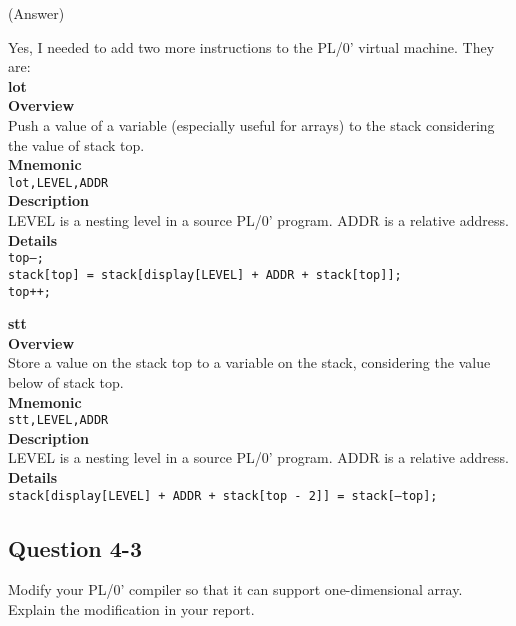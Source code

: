 \documentclass{article}
\begin{document}
\ifreport
(Answer)\\
\fi

Yes, I needed to add two more instructions to the PL/0' virtual machine.
They are:\\

\noindent\textbf{\Large lot}\\

\noindent\textbf{Overview}\\
\indent Push a value of a variable (especially useful for arrays)
 to the stack considering the value of stack top.\\

\noindent\textbf{Mnemonic}\\
\indent \texttt{lot,LEVEL,ADDR}\\

\noindent\textbf{Description}\\
\indent LEVEL is a nesting level in a source PL/0' program.
 ADDR is a relative address.\\

\noindent\textbf{Details}\\
\indent \texttt{top--;\\
\indent stack[top] = stack[display[LEVEL] + ADDR + stack[top]];\\
\indent top++;}\\

\vspace{0.5cm}

\noindent\textbf{\Large stt}\\

\noindent\textbf{Overview}\\
\indent Store a value on the stack top to a variable on the stack,
considering the value below of stack top.\\

\noindent\textbf{Mnemonic}\\
\indent \texttt{stt,LEVEL,ADDR}\\

\noindent\textbf{Description}\\
\indent LEVEL is a nesting level in a source PL/0' program.
 ADDR is a relative address.\\

\noindent\textbf{Details}\\
\indent \texttt{stack[display[LEVEL] + ADDR + stack[top - 2]] = stack[--top];}\\


\subsection*{Question 4-3}
Modify your PL/0' compiler so that it can support one-dimensional array.
Explain the modification in your report.
\end{document}

